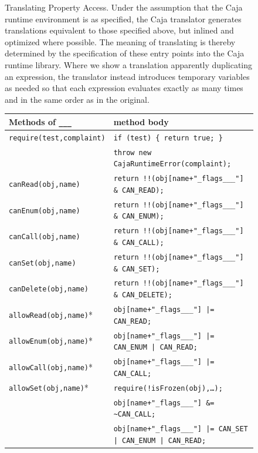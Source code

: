 \documentclass[letterpaper,twocolumn,10pt]{article}
\newcommand{\code}[1]{{\tt {#1}}}              %
\begin{document}
\begin{figure}
\caption[Translating Property Access]{Translating Property Access. Under the 
assumption that the Caja runtime environment is as specified, the Caja 
translator generates translations equivalent to those specified above, but 
inlined and optimized where possible. The meaning of translating is thereby 
determined by the specification of these entry points into the Caja runtime 
library. Where we show a translation apparently duplicating an expression,
the translator instead introduces temporary variables as needed so that
each expression evaluates exactly as many times and in the same order as in
the original.}
\label{tab:prop-xlate}
\end{figure}


\begin{figure}
\begin{tabular}{ll}
  Methods of \code{\_\_\_}  & method body \\ 
  \hline 
  \code{require(test,complaint)}
       & \code{if (test)\ \{ return true; \}} \\
       & \code{throw new CajaRuntimeError(complaint);} \\
  \hline
  \code{canRead(obj,name)}  
       & \code{return !!(obj[name+"\_flags\_\_\_"] \& CAN\_READ);} \\
  \code{canEnum(obj,name)}
       & \code{return !!(obj[name+"\_flags\_\_\_"] \& CAN\_ENUM);} \\
  \code{canCall(obj,name)}
       & \code{return !!(obj[name+"\_flags\_\_\_"] \& CAN\_CALL);} \\
  \code{canSet(obj,name)}
       & \code{return !!(obj[name+"\_flags\_\_\_"] \& CAN\_SET);} \\
  \code{canDelete(obj,name)}
       & \code{return !!(obj[name+"\_flags\_\_\_"] \& CAN\_DELETE);} \\
  \hline
  \code{allowRead(obj,name)}* 
       & \code{obj[name+"\_flags\_\_\_"] |= CAN\_READ;} \\
  \code{allowEnum(obj,name)}* 
       & \code{obj[name+"\_flags\_\_\_"] |= CAN\_ENUM | CAN\_READ;} \\
  \code{allowCall(obj,name)}* 
       & \code{obj[name+"\_flags\_\_\_"] |= CAN\_CALL;} \\
  \code{allowSet(obj,name)}* 
       & \code{require(!isFrozen(obj),\ldots);} \\
       & \code{obj[name+"\_flags\_\_\_"] \&= \~{}CAN\_CALL;} \\
     & \code{obj[name+"\_flags\_\_\_"] |= CAN\_SET | CAN\_ENUM | CAN\_READ;}\\

\end{tabular}
\end{figure}
\end{document}
